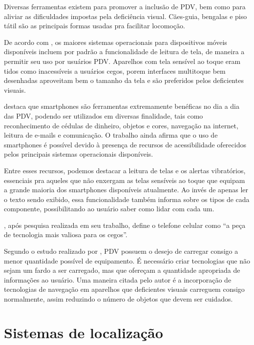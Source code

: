 \documentclass[english,brazilian]{UNISINOSmonografia}
\begin{document}
Diversas ferramentas existem para promover a inclusão de PDV, bem como para aliviar as dificuldades impostas pela deficiência visual. Cães-guia, bengalas e piso tátil são as principais formas usadas pra facilitar locomoção.


De acordo com , os maiores sistemas operacionais para dispositivos móveis disponíveis incluem por padrão a funcionalidade de leitura de tela, de maneira a permitir seu uso por usuários PDV. Aparelhos com tela sensível ao toque eram tidos como inacessíveis a usuários cegos, porem interfaces multitoque bem desenhadas aproveitam bem o tamanho da tela e são preferidos pelos deficientes visuais.

 destaca que smartphones são ferramentas extremamente benéficas no dia a dia das PDV, podendo ser utilizados em diversas finalidade, tais como reconhecimento de cédulas de dinheiro, objetos e cores, navegação na internet, leitura de e-mails e comunicação. O trabalho ainda afirma que o uso de smartphones é possível devido à presença de recursos de acessibilidade oferecidos pelos principais sistemas operacionais disponíveis. 

Entre esses recursos, podemos destacar a leitura de telas e os alertas vibratórios, essenciais pra aqueles que não enxergam as telas sensíveis ao toque que equipam a grande maioria dos smartphones disponíveis atualmente. Ao invés de apenas ler o texto sendo exibido, essa funcionalidade também informa sobre os tipos de cada componente, possibilitando ao usuário saber como lidar com cada um.

, após pesquisa realizada em seu trabalho, define o telefone celular como “a peça de tecnologia mais valiosa para os cegos”. 

Segundo o estudo realizado por , PDV possuem o desejo de carregar consigo a menor quantidade possível de equipamento. É necessário criar tecnologias que não sejam um fardo a ser carregado, mas que ofereçam a quantidade apropriada de informações ao usuário. Uma maneira citada pelo autor é a incorporação de tecnologias de navegação em aparelhos que deficientes visuais carreguem consigo normalmente, assim reduzindo o número de objetos que devem ser cuidados.
	
	\section{Sistemas de localização}
\end{document}
